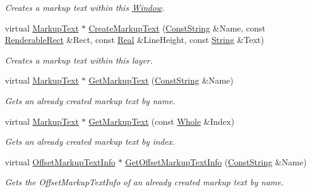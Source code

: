 \begin{DoxyCompactItemize}
\begin{DoxyCompactList}\small\item\em Creates a markup text within this \hyperlink{classphys_1_1UI_1_1Window}{Window}. \item\end{DoxyCompactList}\item 
virtual \hyperlink{classphys_1_1UI_1_1MarkupText}{MarkupText} $\ast$ \hyperlink{classphys_1_1UI_1_1Window_ab8281178ff1eb69653267da24c91999b}{CreateMarkupText} (\hyperlink{namespacephys_a5ce5049f8b4bf88d6413c47b504ebb31}{ConstString} \&Name, const \hyperlink{structphys_1_1UI_1_1RenderableRect}{RenderableRect} \&Rect, const \hyperlink{namespacephys_af7eb897198d265b8e868f45240230d5f}{Real} \&LineHeight, const \hyperlink{namespacephys_aa03900411993de7fbfec4789bc1d392e}{String} \&Text)
\begin{DoxyCompactList}\small\item\em Creates a markup text within this layer. \item\end{DoxyCompactList}\item 
virtual \hyperlink{classphys_1_1UI_1_1MarkupText}{MarkupText} $\ast$ \hyperlink{classphys_1_1UI_1_1Window_af5bf2246915fc68558d2a68ed016a68b}{GetMarkupText} (\hyperlink{namespacephys_a5ce5049f8b4bf88d6413c47b504ebb31}{ConstString} \&Name)
\begin{DoxyCompactList}\small\item\em Gets an already created markup text by name. \item\end{DoxyCompactList}\item 
virtual \hyperlink{classphys_1_1UI_1_1MarkupText}{MarkupText} $\ast$ \hyperlink{classphys_1_1UI_1_1Window_a7f9a97e3f8c70b0a7917a7768e5d53aa}{GetMarkupText} (const \hyperlink{namespacephys_a460f6bc24c8dd347b05e0366ae34f34a}{Whole} \&Index)
\begin{DoxyCompactList}\small\item\em Gets an already created markup text by index. \item\end{DoxyCompactList}\item 
virtual \hyperlink{structphys_1_1UI_1_1ResizingInfo}{OffsetMarkupTextInfo} $\ast$ \hyperlink{classphys_1_1UI_1_1Window_a9906bb131f631af0a9aed7dbb7744112}{GetOffsetMarkupTextInfo} (\hyperlink{namespacephys_a5ce5049f8b4bf88d6413c47b504ebb31}{ConstString} \&Name)
\begin{DoxyCompactList}\small\item\em Gets the OffsetMarkupTextInfo of an already created markup text by name. \item\end{DoxyCompactList}\item 

\end{DoxyCompactItemize}

